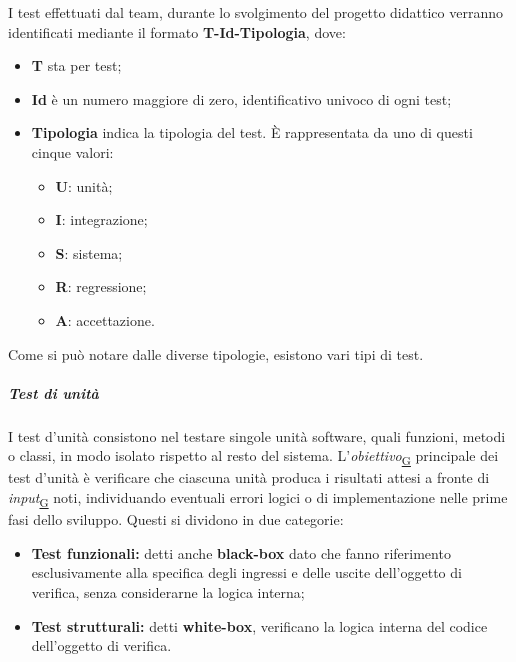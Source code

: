 \documentclass[a4paper,12pt]{article}
\begin{document}
                I test effettuati dal team, durante lo svolgimento del progetto didattico verranno identificati mediante il formato \textbf{T-Id-Tipologia}, dove:
                \begin{itemize}
                    \item \textbf{T} sta per test;
                    \item \textbf{Id} è un numero maggiore di zero, identificativo univoco di ogni test;
                    \item \textbf{Tipologia} indica la tipologia del test. È rappresentata da uno di questi cinque valori:
                    \begin{itemize}
                        \item \textbf{U}: unità;
                        \item \textbf{I}: integrazione;
                        \item \textbf{S}: sistema;
                        \item \textbf{R}: regressione;
                        \item \textbf{A}: accettazione.
                    \end{itemize}
                \end{itemize}            
                Come si può notare dalle diverse tipologie, esistono vari tipi di test.
                
                \subparagraph{Test di unità}\hfill\break
                    I test d'unità consistono nel testare singole unità software, quali funzioni, metodi o classi, in modo isolato rispetto al resto del sistema.\newline
                    L'\textit{obiettivo}\textsubscript{\href{https://atlasteam9.github.io/Atlas/glossario.html\#Obiettivo}{G}} principale dei test d'unità è verificare che ciascuna unità produca i risultati attesi a fronte di \textit{input}\textsubscript{\href{https://atlasteam9.github.io/Atlas/glossario.html\#Input}{G}} noti, individuando eventuali errori logici o di implementazione nelle prime fasi dello sviluppo.
                    Questi si dividono in due categorie:
                    \begin{itemize}
                        \item \textbf{Test funzionali:} detti anche \textbf{black-box} dato che fanno riferimento esclusivamente alla specifica degli ingressi e delle uscite dell'oggetto di verifica, senza considerarne la logica interna;
                        \item \textbf{Test strutturali:} detti \textbf{white-box}, verificano la logica interna del codice dell'oggetto di verifica.
                    \end{itemize}
                    
\end{document}
